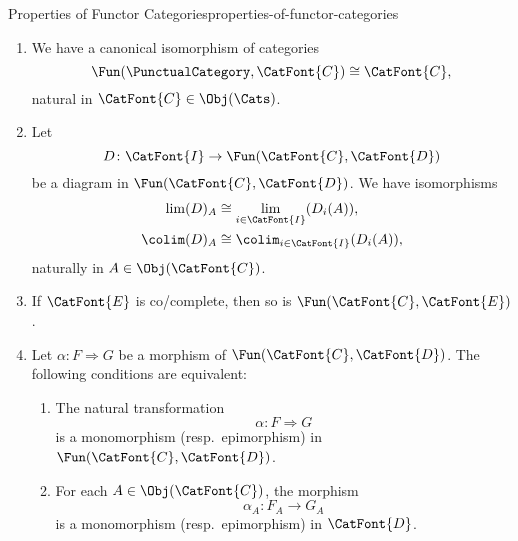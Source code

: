 \begin{proposition}{Properties of Functor Categories}{properties-of-functor-categories}
\begin{enumerate}
\begin{align*}
            \end{align*}
            natural in $\CatFont{C},\CatFont{D},\CatFont{E}\in\Obj(\TwoCategoryOfCategories)$.
        \item\label{properties-of-functor-categories-interaction-with-punctual-categories}We have a canonical isomorphism of categories
            \[
                \Fun(\PunctualCategory,\CatFont{C})
                \cong
                \CatFont{C},
            \]%
            natural in $\CatFont{C}\in\Obj(\Cats)$.
        \item\label{properties-of-functor-categories-objectwise-computation-of-co-limits}Let
            \[
                D
                \colon
                \CatFont{I}
                \to
                \Fun(\CatFont{C},\CatFont{D})
            \]%
            be a diagram in $\Fun(\CatFont{C},\CatFont{D})$. We have isomorphisms
            \begin{align*}
                \lim(D)_{A}   &\cong \lim_{i\in\CatFont{I}}(D_{i}(A)),\\
                \colim(D)_{A} &\cong \colim_{i\in\CatFont{I}}(D_{i}(A)),
            \end{align*}
            naturally in $A\in\Obj(\CatFont{C})$.
        \item\label{properties-of-functor-categories-interaction-with-co-cocompleteness}If $\CatFont{E}$ is co/complete, then so is $\Fun(\CatFont{C},\CatFont{E})$.
        \item\label{properties-of-functor-categories-monomorphisms-and-epimorphisms}Let $\alpha\colon F\Longrightarrow G$ be a morphism of $\Fun(\CatFont{C},\CatFont{D})$. The following conditions are equivalent:
            \begin{enumerate}
                \item\label{properties-of-functor-categories-monomorphisms-and-epimorphisms-a}The natural transformation
                    \[
                        \alpha
                        \colon
                        F
                        \Longrightarrow
                        G
                    \]%
                    is a monomorphism (resp.\ epimorphism) in $\Fun(\CatFont{C},\CatFont{D})$.
                \item\label{properties-of-functor-categories-monomorphisms-and-epimorphisms-b}For each $A\in\Obj(\CatFont{C})$, the morphism
                    \[
                        \alpha_{A}
                        \colon
                        F_{A}
                        \to
                        G_{A}
                    \]%
                    is a monomorphism (resp.\ epimorphism) in $\CatFont{D}$.
            \end{enumerate}
    \end{enumerate}
\end{proposition}
